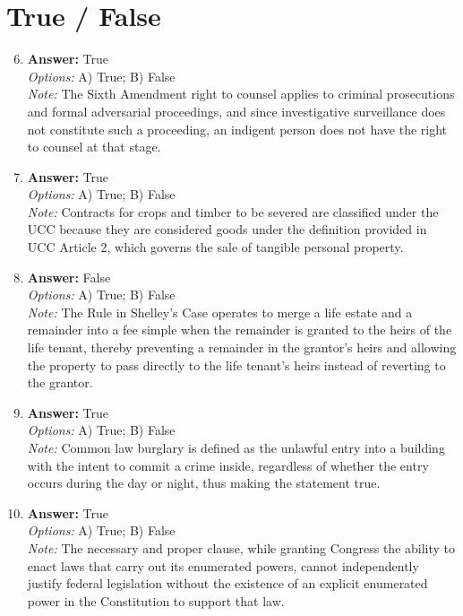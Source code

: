 \documentclass[12pt]{article}
\begin{document}
\section*{True / False}
\begin{enumerate}[label=\arabic*.]
\setcounter{enumi}{5}
\item \textbf{Answer:} True
\\ \textit{Options:} A) True; B) False
\\ \textit{Note:} The Sixth Amendment right to counsel applies to criminal prosecutions and formal adversarial proceedings, and since investigative surveillance does not constitute such a proceeding, an indigent person does not have the right to counsel at that stage.
\item \textbf{Answer:} True
\\ \textit{Options:} A) True; B) False
\\ \textit{Note:} Contracts for crops and timber to be severed are classified under the UCC because they are considered goods under the definition provided in UCC Article 2, which governs the sale of tangible personal property.
\item \textbf{Answer:} False
\\ \textit{Options:} A) True; B) False
\\ \textit{Note:} The Rule in Shelley's Case operates to merge a life estate and a remainder into a fee simple when the remainder is granted to the heirs of the life tenant, thereby preventing a remainder in the grantor's heirs and allowing the property to pass directly to the life tenant's heirs instead of reverting to the grantor.
\item \textbf{Answer:} True
\\ \textit{Options:} A) True; B) False
\\ \textit{Note:} Common law burglary is defined as the unlawful entry into a building with the intent to commit a crime inside, regardless of whether the entry occurs during the day or night, thus making the statement true.
\item \textbf{Answer:} True
\\ \textit{Options:} A) True; B) False
\\ \textit{Note:} The necessary and proper clause, while granting Congress the ability to enact laws that carry out its enumerated powers, cannot independently justify federal legislation without the existence of an explicit enumerated power in the Constitution to support that law.
\end{enumerate}
\end{document}
